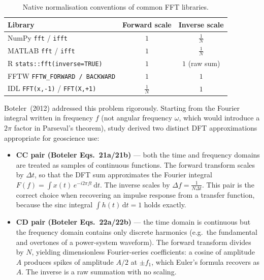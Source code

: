 \documentclass[12pt,a4paper]{article}
\begin{document}
\begin{table}[h!]
\caption{Native normalisation conventions of common FFT libraries.}
\label{tab:conventions}
\centering
\begin{tabular}{@{}lcc@{}}
\toprule
\textbf{Library} & \textbf{Forward scale} & \textbf{Inverse scale} \\
\midrule
NumPy \texttt{fft} / \texttt{ifft}              & $1$     & $\frac{1}{N}$ \\
MATLAB \texttt{fft} / \texttt{ifft}             & $1$     & $\frac{1}{N}$ \\
R \texttt{stats::fft(inverse=TRUE)}             & $1$     & $1$ (raw sum) \\
FFTW \texttt{FFTW\_FORWARD / BACKWARD}          & $1$     & $1$ \\
IDL \texttt{FFT(x,-1)} / \texttt{FFT(X,+1)}    & $\frac{1}{N}$   & $1$ \\
\bottomrule
\end{tabular}
\end{table}

Boteler~(2012) addressed this problem rigorously. Starting from the Fourier
integral written in frequency $f$ (not angular frequency $\omega$, which would
introduce a $2\pi$ factor in Parseval's theorem), study derived two distinct DFT
approximations appropriate for geoscience use:

\begin{itemize}
  \item \textbf{CC pair (Boteler Eqs.\ 21a/21b)} --- both the time and frequency
    domains are treated as samples of continuous functions. The forward transform
    scales by $\Delta t$, so that the DFT sum approximates the Fourier integral
    $F(f) = \int x(t)\,e^{-i2\pi ft}\,\mathrm{d}t$. The inverse scales by
    $\Delta f = \frac{1}{N\Delta t}$. This pair is the correct choice when recovering
    an impulse response from a transfer function, because the sinc integral
    $\int h(t)\,\mathrm{d}t = 1$ holds exactly.

  \item \textbf{CD pair (Boteler Eqs.\ 22a/22b)} --- the time domain is
    continuous but the frequency domain contains only discrete harmonics
    (e.g.\ the fundamental and overtones of a power-system waveform). The forward
    transform divides by $N$, yielding dimensionless Fourier-series coefficients:
    a cosine of amplitude $A$ produces spikes of amplitude $A/2$ at $\pm f_1$,
    which Euler's formula recovers as $A$. The inverse is a raw summation with no
    scaling.
\end{itemize}
\end{document}
